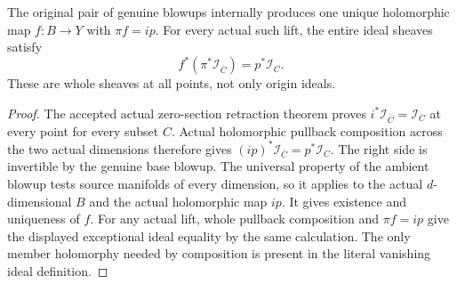 \begin{theorem}
\label{hir:actual-zero-section-genuine-blowup-lift}
\leanok
The original pair of genuine blowups internally produces one unique
holomorphic map $f:B\to Y$ with $\pi f=ip$. For every actual such lift,
the entire ideal sheaves satisfy
\[
 f^*(\pi^*\mathcal I_{\bar C})=p^*\mathcal I_C.
\]
These are whole sheaves at all points, not only origin ideals.
\end{theorem}
\begin{proof}
The accepted actual zero-section retraction theorem proves
$i^*\mathcal I_{\bar C}=\mathcal I_C$ at every point for every subset
$C$. Actual holomorphic pullback composition across the two actual
dimensions therefore gives
$(ip)^*\mathcal I_{\bar C}=p^*\mathcal I_C$. The right side is
invertible by the genuine base blowup. The universal property of the
ambient blowup tests source manifolds of every dimension, so it applies
to the actual $d$-dimensional $B$ and the actual holomorphic map $ip$.
It gives existence and uniqueness of $f$. For any actual lift, whole
pullback composition and $\pi f=ip$ give the displayed exceptional
ideal equality by the same calculation. The only member holomorphy needed
by composition is present in the literal vanishing ideal definition.
\end{proof}

